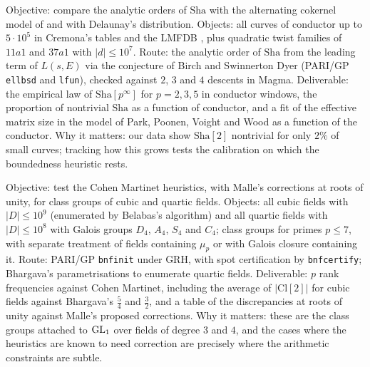 \begin{compproblem}
Objective: compare the analytic orders of $\mathrm{Sha}$ with the alternating cokernel model of \cite{bklpr2015} and with Delaunay's distribution. Objects: all curves of conductor up to $5\cdot10^5$ in Cremona's tables and the LMFDB \cite{lmfdb}, plus quadratic twist families of $11a1$ and $37a1$ with $|d|\le10^7$. Route: the analytic order of $\mathrm{Sha}$ from the leading term of $L(s,E)$ via the conjecture of Birch and Swinnerton Dyer (PARI/GP \texttt{ellbsd} and \texttt{lfun}), checked against $2$, $3$ and $4$ descents in Magma. Deliverable: the empirical law of $\mathrm{Sha}[p^\infty]$ for $p = 2,3,5$ in conductor windows, the proportion of nontrivial $\mathrm{Sha}$ as a function of conductor, and a fit of the effective matrix size in the model of Park, Poonen, Voight and Wood as a function of the conductor. Why it matters: our data show $\mathrm{Sha}[2]$ nontrivial for only $2\%$ of small curves; tracking how this grows tests the calibration on which the boundedness heuristic rests.
\end{compproblem}

\begin{compproblem}
Objective: test the Cohen Martinet heuristics, with Malle's corrections at roots of unity, for class groups of cubic and quartic fields. Objects: all cubic fields with $|D|\le10^{9}$ (enumerated by Belabas's algorithm) and all quartic fields with $|D|\le10^{8}$ with Galois groups $D_4$, $A_4$, $S_4$ and $C_4$; class groups for primes $p\le7$, with separate treatment of fields containing $\mu_p$ or with Galois closure containing it. Route: PARI/GP \texttt{bnfinit} under GRH, with spot certification by \texttt{bnfcertify}; Bhargava's parametrisations to enumerate quartic fields. Deliverable: $p$ rank frequencies against Cohen Martinet, including the average of $|\mathrm{Cl}[2]|$ for cubic fields against Bhargava's $\frac54$ and $\frac32$, and a table of the discrepancies at roots of unity against Malle's proposed corrections. Why it matters: these are the class groups attached to $\mathrm{GL}_1$ over fields of degree $3$ and $4$, and the cases where the heuristics are known to need correction are precisely where the arithmetic constraints are subtle.
\end{compproblem}
